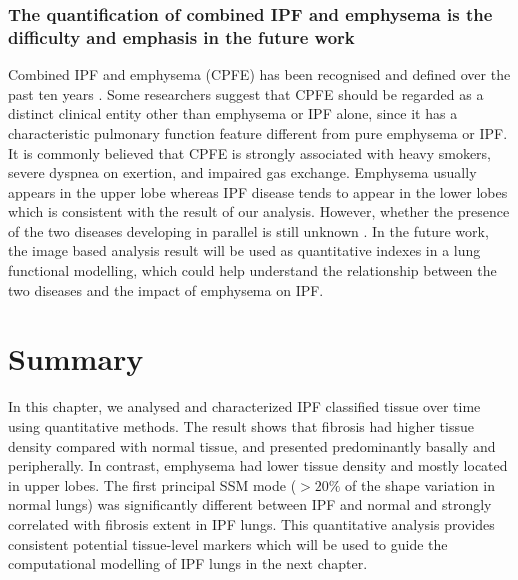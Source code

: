 \subsubsection{The quantification of combined IPF and emphysema is the difficulty and emphasis in the future work}
Combined IPF and emphysema (CPFE) has been recognised and defined over the past ten years \citep{cottin2005combined,meltzer2008idiopathic}. Some researchers suggest that CPFE should be regarded as a distinct clinical entity other than emphysema or IPF alone, since it has a characteristic pulmonary function feature different from pure emphysema or IPF. It is commonly believed that CPFE is strongly associated with heavy smokers, severe dyspnea on exertion, and impaired gas exchange. Emphysema usually appears in the upper lobe whereas IPF disease tends to appear in the lower lobes \citep{lin2015combined} which is consistent with the result of our analysis. However, whether the presence of the two diseases developing in parallel is still unknown \citep{cottin2005combined, king2011idiopathic, lin2015combined}. In the future work, the image based analysis result will be used as quantitative indexes in a lung functional modelling, which could help understand the relationship between the two diseases and the impact of emphysema on IPF.

\section{Summary}
In this chapter, we analysed and characterized IPF classified tissue over time using quantitative methods. The result shows that fibrosis had higher tissue density compared with normal tissue, and presented predominantly basally and peripherally. In contrast, emphysema had lower tissue density and mostly located in upper lobes. The first principal SSM mode ($>20\%$ of the shape variation in normal lungs) was significantly different between IPF and normal and strongly correlated with fibrosis extent in IPF lungs. This quantitative analysis provides consistent potential tissue-level markers which will be used to guide the computational modelling of IPF lungs in the next chapter.